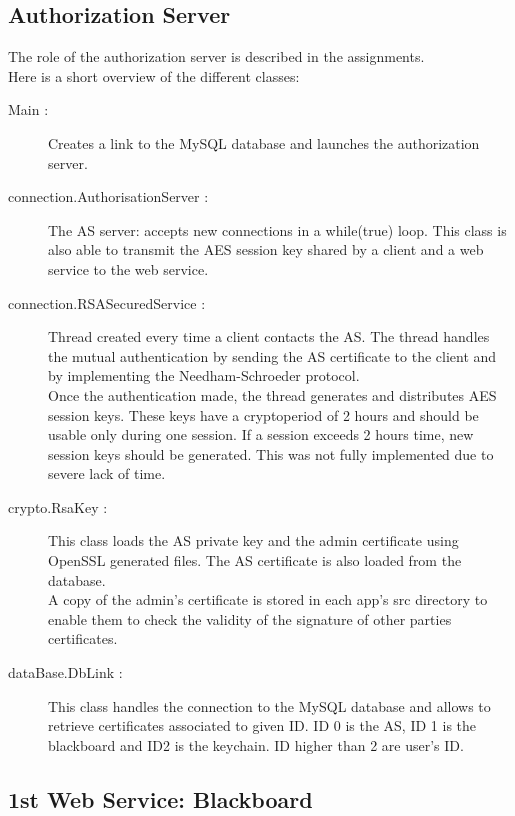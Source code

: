 \subsection{Authorization Server}
The role of the authorization server is described in the assignments.\\
Here is a short overview of the different classes:\\ 

\begin{description}
\item[Main :] Creates a link to the MySQL database and launches the authorization server.

\item[connection.AuthorisationServer :] The AS server: accepts new connections in a while(true) loop. This class is also able to transmit the AES session key shared by a client and a web service to the web service.

\item[connection.RSASecuredService :] Thread created every time a client contacts the AS. The thread handles the mutual authentication by sending the AS certificate to the client and by implementing the Needham-Schroeder protocol. \\
Once the authentication made, the thread generates and distributes AES session keys. These keys have a cryptoperiod of 2 hours and should be usable only during one session. If a session exceeds 2 hours time, new session keys should be generated. This was not fully implemented due to severe lack of time.

\item[crypto.RsaKey :] This class loads the AS private key and the admin certificate using OpenSSL generated files. The AS certificate is also loaded from the database. \\
A copy of the admin's certificate is stored in each app's src directory to enable them to check the validity of the signature of other parties certificates.

\item[dataBase.DbLink :] This class handles the connection to the MySQL database and allows to retrieve certificates associated to given ID. ID 0 is the AS, ID 1 is the blackboard and ID2 is the keychain. ID higher than 2 are user's ID.

\end{description}

\subsection{1st Web Service: Blackboard}

